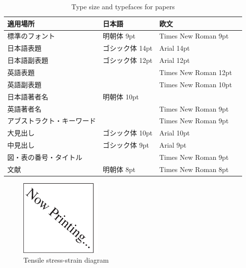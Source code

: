 \documentclass{jarticle}
\begin{document}
\begin{table}[tb]
 \caption{Type size and typefaces for papers}
 \label{tbl: table1}
 \centering
 \footnotesize
 \begin{tabular}{|p{}|l|l|l|}
  \hline
	適用場所	&日本語	&欧文 \\\hline
	標準のフォント	&明朝体 9pt	&Times New Roman 9pt \\\hline
	日本語表題	&ゴシック体 14pt	&Arial 14pt \\\hline
	日本語副表題	&ゴシック体 12pt	&Arial 12pt \\\hline
	英語表題	&&Times New Roman 12pt \\\hline
	英語副表題	&&Times New Roman 10pt \\\hline
	日本語著者名	&明朝体 10pt &\\\hline
	英語著者名	&&Times New Roman 9pt \\\hline
	アブストラクト・キーワード	&&Times New Roman 9pt \\\hline
	大見出し	&ゴシック体 10pt	&Arial 10pt \\\hline
	中見出し	&ゴシック体 9pt	&Arial 9pt \\\hline
	図・表の番号・タイトル	 &&Times New Roman 9pt \\\hline
	文献	&明朝体 8pt	&Times New Roman 8pt \\
  \hline
 \end{tabular}
\end{table}

\begin{figure}[tb]
 \centering
  \includegraphics[height=38mm]{figs/nowprinting.eps}
  \vspace*{-4mm}
  \caption{Tensile stress-strain diagram}
  \label{fig: fig1}
\end{figure}


\footnotesize



\normalsize
\end{document}
